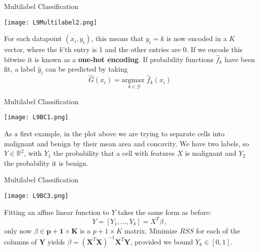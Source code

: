\documentclass[10pt, table, dvipsnames,xcdraw, handout]{beamer}
\newcommand{\cG}{\ensuremath{\mathcal{G}}}
\begin{document}
\begin{frame}[fragile]{Multilabel Classification}
  \begin{minipage}[t][0.5\textheight][t]{\textwidth}
	\centering \texttt{[image: L9Multilabel2.png]} 
  \end{minipage}
  \vfill
\begin{minipage}[t][0.5\textheight][t]{\textwidth}
For each datapoint $(x_i, y_i)$, this means that $y_i = k$ is now encoded in a $K$ vector, where the $k$'th entry is 1 and the other entries are 0. If we encode this bitwise it is known as a \textbf{one-hot encoding}. \pause If probability functions $\hat f_k$ have been fit, a label $\hat y_i$ can be predicted by taking
$$
\hat G(x_i) = \underset{k\in \cG}{\text{argmax }} \hat f_k(x_i)
$$
\end{minipage}
\end{frame}





\begin{frame}[fragile]{Multilabel Classification}
  \begin{minipage}[t][0.5\textheight][t]{\textwidth}
	\centering \texttt{[image: L9BC1.png]} 
  \end{minipage}
  \vfill
\begin{minipage}[t][0.5\textheight][t]{\textwidth}
As a first example, in the plot above we are trying to separate cells into malignant and benign by their mean area and concavity. We have two labels, so $Y\in \mathbb{R}^2$, with $Y_1$ the probability that a cell with features $X$ is malignant and $Y_2$ the probability it is benign. 

\end{minipage}
\end{frame}


\begin{frame}[fragile]{Multilabel Classification}
  \begin{minipage}[t][0.5\textheight][t]{\textwidth}
	\centering \texttt{[image: L9BC3.png]} 
  \end{minipage}
  \vfill
\begin{minipage}[t][0.5\textheight][t]{\textwidth}
Fitting an affine linear function to $Y$ takes the same form as before:
$$
Y = [Y_1,\ldots, Y_k] = X^T\beta\,,
$$
only now $\beta \in \mathbf{p+1\times K}$ is a $p+1\times K$ matrix. Minimize $RSS$ for each of the columns of $\mathbf{Y}$ yields $\beta = (\mathbf{X}^T\mathbf{X})^{-1}\mathbf{X}^T\mathbf{Y}$, provided we bound $Y_k\in [0,1]$. 
\end{minipage}
\end{frame}
\end{document}
